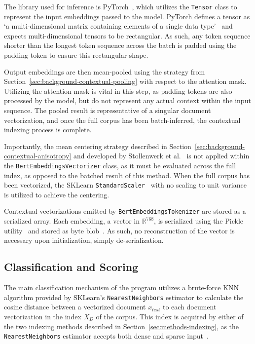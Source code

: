\documentclass[11pt]{article}
\theoremstyle{plain}
\theoremstyle{definition}
\begin{document}
The library used for inference is PyTorch~\cite{ansel/2024/pytorch}, which utilizes the \verb|Tensor| class to represent the input embeddings passed to the model. PyTorch defines a tensor as `a multi-dimensional matrix containing elements of a single data type'~\cite{pytorch/2026/tensor} and expects multi-dimensional tensors to be rectangular. As such, any token sequence shorter than the longest token sequence across the batch is padded using the padding token to ensure this rectangular shape.

Output embeddings are then mean-pooled using the strategy from Section~\ref{sec:background-contextual-pooling} with respect to the attention mask. Utilizing the attention mask is vital in this step, as padding tokens are also processed by the model, but do not represent any actual context within the input sequence. The pooled result is representative of a singular document vectorization, and once the full corpus has been batch-inferred, the contextual indexing process is complete.

Importantly, the mean centering strategy described in Section~\ref{sec:background-contextual-anisotropy}  and developed by Stollenwerk et al.\ \cite{stollenwerk/2026/output} is not applied within the \verb|BertEmbeddingsVectorizer| class, as it must be evaluated across the full index, as opposed to the batched result of this method. When the full corpus has been vectorized, the SKLearn \verb|StandardScaler|~\cite{sklearn/2026/standardscaler} with no scaling to unit variance is utilized to achieve the centering.

Contextual vectorizations emitted by \verb|BertEmbeddingsTokenizer| are stored as a serialized array. Each embedding, a vector in $\mathbb{R}^{768}$, is serialized using the Pickle utility~\cite{python/2026/pickle} and stored as byte blob~\cite{sqlite/2026/datatypes}. As such, no reconstruction of the vector is necessary upon initialization, simply de-serialization.

\subsection{Classification and Scoring}\label{sec:methods-scoring}

The main classification mechanism of the program utilizes a brute-force KNN algorithm provided by SKLearn's \verb|NearestNeighbors| estimator to calculate the cosine distance between a vectorized document $x_{test}$ to each document vectorization in the index $X_D$ of the corpus. This index is acquired by either of the two indexing methods described in Section~\ref{sec:methods-indexing}, as the \verb|NearestNeighbors| estimator accepts both dense and sparse input~\cite{sklearn/2026/nearestneighbors}.
\end{document}
